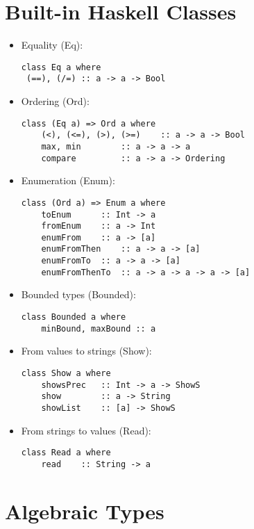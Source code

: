 \documentclass{article}
\begin{document}
\section{Built-in Haskell Classes}

\begin{itemize}
\item Equality (Eq):
\begin{lstlisting}
class Eq a where
 (==), (/=) :: a -> a -> Bool
\end{lstlisting}
\item Ordering (Ord):
\begin{lstlisting}
class (Eq a) => Ord a where
	(<), (<=), (>), (>=)	:: a -> a -> Bool
	max, min		:: a -> a -> a
	compare			:: a -> a -> Ordering
\end{lstlisting}
\item Enumeration (Enum):
\begin{lstlisting}
class (Ord a) => Enum a where
	toEnum		:: Int -> a
	fromEnum	:: a -> Int
	enumFrom	:: a -> [a]
	enumFromThen	:: a -> a -> [a]
	enumFromTo	:: a -> a -> [a]
	enumFromThenTo	:: a -> a -> a -> a -> [a]
\end{lstlisting}
\item Bounded types (Bounded):
\begin{lstlisting}
class Bounded a where
	minBound, maxBound :: a
\end{lstlisting}
\item From values to strings (Show):
\begin{lstlisting}
class Show a where
	showsPrec	:: Int -> a -> ShowS
	show		:: a -> String
	showList	:: [a] -> ShowS
\end{lstlisting}
\item From strings to values (Read):
\begin{lstlisting}
class Read a where
	read	:: String -> a
\end{lstlisting}
\end{itemize}

\section{Algebraic Types}
\end{document}
